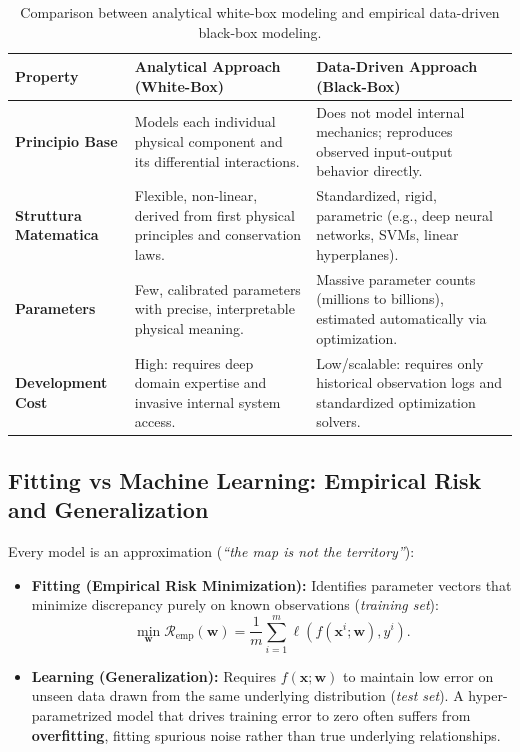 \begin{table}[H]
\centering
\small
\begin{tabularx}{\textwidth}{@{} l Y Y @{}}
\toprule
\textbf{Property} & \textbf{Analytical Approach (White-Box)} & \textbf{Data-Driven Approach (Black-Box)} \\
\midrule
\textbf{Principio Base} & Models each individual physical component and its differential interactions. & Does not model internal mechanics; reproduces observed input-output behavior directly. \\
\addlinespace
\textbf{Struttura Matematica} & Flexible, non-linear, derived from first physical principles and conservation laws. & Standardized, rigid, parametric (e.g., deep neural networks, SVMs, linear hyperplanes). \\
\addlinespace
\textbf{Parameters} & Few, calibrated parameters with precise, interpretable physical meaning. & Massive parameter counts (millions to billions), estimated automatically via optimization. \\
\addlinespace
\textbf{Development Cost} & High: requires deep domain expertise and invasive internal system access. & Low/scalable: requires only historical observation logs and standardized optimization solvers. \\
\bottomrule
\end{tabularx}
\caption{Comparison between analytical white-box modeling and empirical data-driven black-box modeling.}
\label{tab:model-comparison}
\end{table}

\subsection{Fitting vs Machine Learning: Empirical Risk and Generalization}
Every model is an approximation (\textit{``the map is not the territory''}):
\begin{itemize}
    \item \textbf{Fitting (Empirical Risk Minimization):} Identifies parameter vectors that minimize discrepancy purely on known observations (\textit{training set}):
    \begin{equation}
        \min_{\mathbf{w}} \mathcal{R}_{\text{emp}}(\mathbf{w}) = \frac{1}{m} \sum_{i=1}^m \ell(f(\mathbf{x}^i; \mathbf{w}), y^i).
    \end{equation}
    \item \textbf{Learning (Generalization):} Requires $f(\mathbf{x}; \mathbf{w})$ to maintain low error on unseen data drawn from the same underlying distribution (\textit{test set}). A hyper-parametrized model that drives training error to zero often suffers from \textbf{overfitting}, fitting spurious noise rather than true underlying relationships.
\end{itemize}

